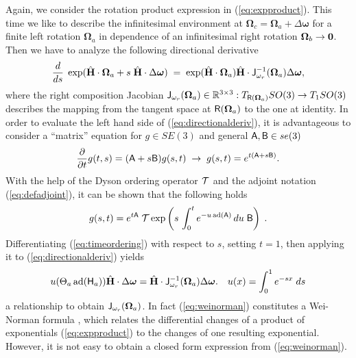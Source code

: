 \documentclass[conference]{IEEEtran}
\newcommand{\real}{\Bbb R}
\newcommand{\bfomega}{\boldsymbol{\omega}}
\newcommand{\bfOmega}{\boldsymbol{\Omega}}
\newcommand{\adj}[1]{\mathrm{ad}({#1})}
\newcommand{\beq}{\begin{equation}}
\newcommand{\eeq}{\end{equation}}
\begin{document}
\begin{appendix}
Again, we consider the rotation product expression in (\ref{eq:expproduct}). This time we
like to describe the infinitesimal environment at $\bfOmega_c = \bfOmega_a + \Delta\bfomega$
for a finite left rotation $\bfOmega_a$ in dependence of an infinitesimal right rotation $\bfOmega_b \rightarrow \bf 0$.
Then we have to analyze the following directional derivative
\beq
    {d\over ds}\;\exp(\hat{\bf H}\cdot\bfOmega_a + s\;\hat{\bf H}\cdot\Delta\bfomega)
    \; = \; \exp(\hat{\bf H}\cdot\bfOmega_a) \hat{\bf H}\cdot{\sf J}_{\omega_r}^{-1}(\bfOmega_a)
    \Delta\bfomega,
    \label{eq:directionalderiv}
\eeq
where the right composition Jacobian ${\sf J}_{\omega_r}(\bfOmega_a) \in \real^{3\times3}: 
T_{{\sf R}(\bfOmega_a)}SO(3)\rightarrow T_1SO(3)$ describes the
mapping from the tangent space at ${\sf R}(\bfOmega_a)$ to the one at identity.
In order to evaluate the left hand side of (\ref{eq:directionalderiv}), it is advantageous to
consider a ``matrix'' equation for $g\in SE(3)$ and general ${\sf A},{\sf B}\in se(3)$
\beq
    {\partial \over \partial t}g(t,s) = ({\sf A} + s{\sf B})g(s,t)\; \rightarrow \;
    g(s,t) = e^{t ({\sf A}+s{\sf B})}. \label{eq:SE3diff}
\eeq
With the help of the Dyson ordering operator ${\cal T}$ 
and the adjoint notation (\ref{eq:defadjoint}), it can be shown that the following holds
\beq
    g(s,t) = e^{t {\sf A}} \; {\cal T}\exp\left( s\,
    \int_0^t e^{-u\, \adj{\sf A}} \, du \; {\sf B} \right ) \; .
    \label{eq:timeordering}
\eeq
Differentiating (\ref{eq:timeordering}) with respect to $s$, setting $t=1$,
then applying it to (\ref{eq:directionalderiv}) yields
\beq
    u(\Theta_a\, \adj{{\sf H}_a} )
    \hat{\bf H}\cdot\Delta\bfomega = \hat{\bf H}\cdot {\sf J}_{\omega_r}^{-1}(\bfOmega_a)
    \Delta\bfomega. \quad u(x)=\int_0^1 e^{-s x} \; ds
    \label{eq:weinorman}
\eeq
a relationship to obtain ${\sf J}_{\omega_r}(\bfOmega_a)$. In fact (\ref{eq:weinorman}) constitutes a
Wei-Norman formula \cite{Wei-Norman}, which relates the differential changes of a product of
exponentials (\ref{eq:expproduct}) to the changes of one resulting exponential. However, it is not easy
to obtain a closed form expression from (\ref{eq:weinorman}).


\end{appendix}
\end{document}
